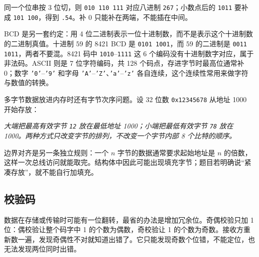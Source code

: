 同一个位串按 3 位切，则 \texttt{010 110 111} 对应八进制 \texttt{267}；小数点后的 \texttt{1011} 要补成 \texttt{101 100}，得到 \texttt{.54}。补 0 只能补在两端，不能插在中间。

BCD 是另一套约定：用 4 位二进制表示一位十进制数，而不是表示这个十进制数的二进制真值。十进制 $59$ 的 8421 BCD 是 \texttt{0101 1001}，而 $59$ 的二进制是 \texttt{0011 1011}，两者不要混。8421 码中 \texttt{1010}--\texttt{1111} 这 6 个编码没有十进制数字对应，属于非法码。ASCII 则是 7 位字符编码，共 128 个码点，存进字节时最高位通常补 0；数字 \texttt{'0'}--\texttt{'9'} 和字母 \texttt{'A'}--\texttt{'Z'}、\texttt{'a'}--\texttt{'z'} 各自连续，这个连续性常用来做字符与数值的转换。

多字节数据放进内存时还有字节次序问题。设 32 位数 \texttt{0x12345678} 从地址 1000 开始存放：

\begin{center}
\par\vspace{2pt}
{\footnotesize\itshape 大端把最高有效字节 \texttt{12} 放在最低地址 1000；小端把最低有效字节 \texttt{78} 放在 1000。两种方式只改变字节的排列，不改变一个字节内部 8 个比特的顺序。}
\end{center}

边界对齐是另一条独立规则：一个 $n$ 字节的数据通常要求起始地址是 $n$ 的倍数，这样一次总线访问就能取完。结构体中因此可能出现填充字节；题目若明确说“紧凑存放”，就不能自行加填充。

\subsection{校验码}

数据在存储或传输时可能有一位翻转，最省的办法是增加冗余位。奇偶校验只加 1 位：偶校验让整个码字中 1 的个数为偶数，奇校验让 1 的个数为奇数。接收方重新数一遍，发现奇偶性不对就知道出错了。它只能发现奇数个位错，不能定位，也无法发现两位同时出错。


